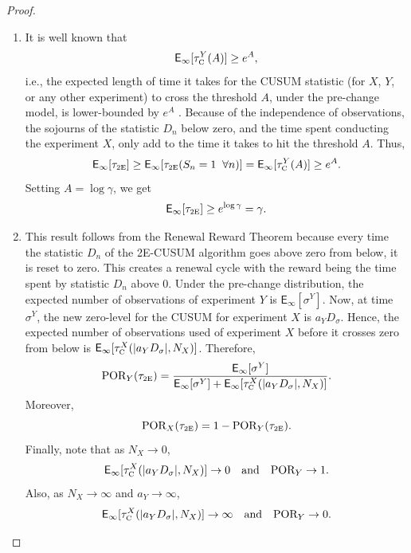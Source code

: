 \documentclass[journal, onecolumn]{IEEEtran}
\begin{document}
\begin{proof}
\begin{enumerate}
\item It is well known that
$$ \mathsf{E}_\infty [\tau_{\textup{\fontsize{6 pt}{10 pt}\selectfont C}}^Y (A)] \geq e^A, $$
i.e., the expected length of time it takes for the CUSUM statistic (for $X$, $Y$, or any other experiment) to cross the threshold $A$, under the pre-change model, is lower-bounded by $e^A$ \cite{lorden1971}. Because of the independence of observations, the sojourns of the statistic $D_n$ below zero, and the time spent conducting the experiment $X$, only add to the time it takes to hit the threshold $A$. Thus, 
$$ \mathsf{E}_\infty [\tau_{\textup{\fontsize{6 pt}{10 pt}\selectfont 2E}}] \geq \mathsf{E}_\infty [\tau_{\textup{\fontsize{6 pt}{10 pt}\selectfont 2E}} (S_n = 1 \;\; \forall n)] = \mathsf{E}_\infty [\tau_{\textup{\fontsize{6 pt}{10 pt}\selectfont C}}^Y (A)] \geq e^A. $$
Setting $A = \log \gamma$, we get
$$ \mathsf{E}_\infty [\tau_{\textup{\fontsize{6 pt}{10 pt}\selectfont 2E}}] \geq e^{\log \gamma} = \gamma. $$

\item This result follows from the Renewal Reward Theorem because every time the statistic $D_n$ of the 2E-CUSUM algorithm goes above zero from below, it is reset to zero. This creates a renewal cycle with the reward being the time spent by statistic $D_n$ above $0$. Under the pre-change distribution, the expected number of observations of experiment $Y$ is $\mathsf{E}_\infty [\sigma^Y]$. Now, at time $\sigma^Y$, the new zero-level for the CUSUM for experiment $X$ is $a_Y D_\sigma$. Hence, the expected number of observations used of experiment $X$ before it crosses zero from below is $\mathsf{E}_\infty [\tau_{\textup{\fontsize{6 pt}{10 pt}\selectfont C}}^X (\vert a_Y D_\sigma \vert, N_X)]$. Therefore,
$$ \textup{POR}_Y (\tau_{\textup{\fontsize{6 pt}{10 pt}\selectfont 2E}}) = \frac{\mathsf{E}_\infty [\sigma^Y]}{\mathsf{E}_\infty [\sigma^Y] + \mathsf{E}_\infty [\tau_{\textup{\fontsize{6 pt}{10 pt}\selectfont C}}^X (\vert a_Y D_\sigma \vert, N_X)]}. $$
Moreover,
$$ \textup{POR}_X (\tau_{\textup{\fontsize{6 pt}{10 pt}\selectfont 2E}}) = 1 - \textup{POR}_Y (\tau_{\textup{\fontsize{6 pt}{10 pt}\selectfont 2E}}). $$
Finally, note that as $N_X \to 0$,
$$ \mathsf{E}_\infty [\tau_{\textup{\fontsize{6 pt}{10 pt}\selectfont C}}^X (\vert a_Y D_\sigma \vert, N_X)] \to 0 \quad \text{and} \quad \textup{POR}_Y \to 1. $$
Also, as $N_X \to \infty$ and $a_Y \to \infty$,
$$ \mathsf{E}_\infty [\tau_{\textup{\fontsize{6 pt}{10 pt}\selectfont C}}^X (\vert a_Y D_\sigma \vert, N_X)] \to \infty \quad \text{and} \quad \textup{POR}_Y \to 0. $$


\end{enumerate}
\end{proof}
\end{document}
